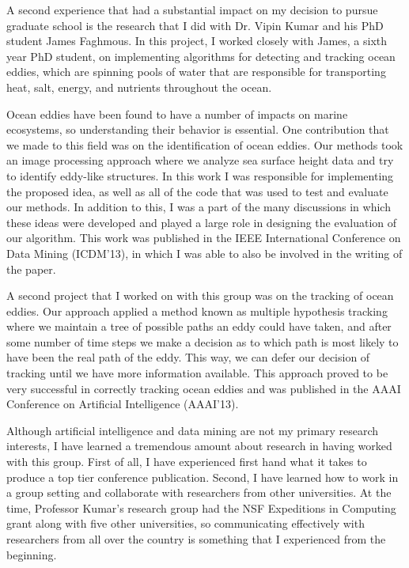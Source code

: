 \documentclass[12pt]{article}
\begin{document}
A second experience that had a substantial impact on my decision to pursue graduate school is the research that I did with Dr. Vipin Kumar and his PhD student James Faghmous. In this project, I worked closely with James, a sixth year PhD student, on implementing algorithms for detecting and tracking ocean eddies, which are spinning pools of water that are responsible for transporting heat, salt, energy, and nutrients throughout the ocean.

Ocean eddies have been found to have a number of impacts on marine ecosystems, so understanding their behavior is essential. One contribution that we made to this field was on the identification of ocean eddies. Our methods took an image processing approach where we analyze sea surface height data and try to identify eddy-like structures.  In this work I was responsible for implementing the proposed idea, as well as all of the code that was used to test and evaluate our methods. In addition to this, I was a part of the many discussions in which these ideas were developed and played a large role in designing the evaluation of our algorithm. This work was published in the IEEE International Conference on Data Mining (ICDM'13), in which I was able to also be involved in the writing of the paper.

A second project that I worked on with this group was on the tracking of ocean eddies.  Our approach applied a method known as multiple hypothesis tracking where we maintain a tree of possible paths an eddy could have taken, and after some number of time steps we make a decision as to which path is most likely to have been the real path of the eddy. This way, we can defer our decision of tracking until we have more information available. This approach proved to be very successful in correctly tracking ocean eddies and was published in the AAAI Conference on Artificial Intelligence (AAAI'13).

Although artificial intelligence and data mining are not my primary research interests, I have learned a tremendous amount about research in having worked with this group. First of all, I have experienced first hand what it takes to produce a top tier conference publication. Second, I have learned how to work in a group setting and collaborate with researchers from other universities. At the time, Professor Kumar's research group had the NSF Expeditions in Computing grant along with five other universities, so communicating effectively with researchers from all over the country is something that I experienced from the beginning.
 
\end{document}
